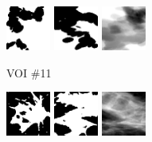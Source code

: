 \documentclass[journal]{IEEEtran}
\begin{document}
\begin{figure}[!htb]
  \includegraphics[width=0.13\textwidth]
  {figure/all/dataset_7/model_coronal}
  \includegraphics[width=0.13\textwidth]
  {figure/all/dataset_7/model_saggital}
  \includegraphics[width=0.13\textwidth]
  {figure/all/dataset_7/proj_roi_inten10}

  {\fontsize{9}{9}\selectfont VOI \#11} \vspace{1mm}

  \includegraphics[width=0.13\textwidth]
  {figure/all/dataset_11/roi_coronal}
  \includegraphics[width=0.13\textwidth]
  {figure/all/dataset_11/roi_saggital}
  \includegraphics[width=0.13\textwidth]
  {figure/all/dataset_11/proj_roi}


\end{figure}
\end{document}
